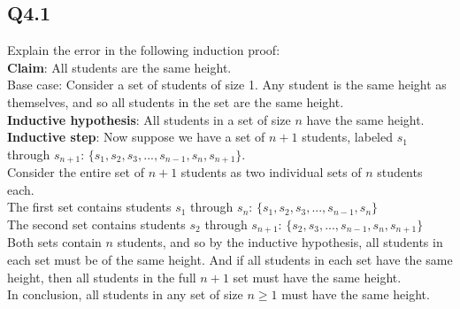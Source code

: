 \documentclass{article}
\begin{document}
\subsection*{Q4.1}
Explain the error in the following induction proof:
\\ \textbf{Claim}: All students are the same height.
\\ Base case: Consider a set of students of size 1. Any student is the same height as themselves, and so all students in the set are the same height.
\\ \textbf{Inductive hypothesis}: All students in a set of size $n$ have the same height. 
\\ \textbf{Inductive step}: Now suppose we have a set of $n+1$ students, labeled $s_1$ through $s_{n+1}$: $\{s_1,s_2,s_3,...,s_{n-1},s_n,s_{n+1}\}$.
\\ Consider the entire set of $n+1$ students as two individual sets of $n$ students each.
\\ The first set contains students $s_1$ through $s_n$: $\{s_1,s_2,s_3,...,s_{n-1},s_n\}$
\\ The second set contains students $s_2$ through $s_{n+1}$: $\{s_2,s_3,...,s_{n-1},s_n,s_{n+1}\}$
\\ Both sets contain $n$ students, and so by the inductive hypothesis, all students in each set must be of the same height. And if all students in each set have the same height, then all students in the full $n+1$ set must have the same height.
\\ In conclusion, all students in any set of size $n\geq1$ must have the same height.
\newpage
\end{document}

